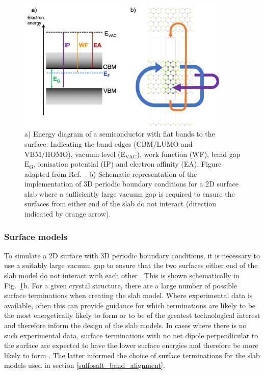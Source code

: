 \documentclass[11pt, twoside]{report}
\begin{document}
\begin{figure}[h!]
  \centering
    \includegraphics[width=0.9\textwidth]{figures/new_slab_figs.png}
    \caption[a) Energy diagram of a semiconductor with flat bands to the surface. Indicating the band edges (CBM/LUMO and VBM/HOMO), vacuum level ($\mathrm{E_{VAC}}$), work function (WF), band gap $\mathrm{E_G}$, ionisation potential (IP) and electron affinity (EA). b) Schematic representation of the implementation of 3D periodic boundary conditions for a 2D surface slab where a sufficiently large vacuum gap is required to ensure the surfaces from either end of the slab do not interact (direction indicated by orange arrow).]{a) Energy diagram of a semiconductor with flat bands to the surface. Indicating the band edges (CBM/LUMO and VBM/HOMO), vacuum level ($\mathrm{E_{VAC}}$), work function (WF), band gap $\mathrm{E_G}$, ionisation potential (IP) and electron affinity (EA). Figure adapted from Ref.~. b) Schematic representation of the implementation of 3D periodic boundary conditions for a 2D surface slab where a sufficiently large vacuum gap is required to ensure the surfaces from either end of the slab do not interact (direction indicated by orange arrow).}
  \label{slabs}
\end{figure}

\subsubsection{Surface models}
To simulate a 2D surface with 3D periodic boundary conditions, it is necessary to use a suitably large vacuum gap to ensure that the two surfaces either end of the slab model do not interact with each other \cite{Prasad_ch6}. This is shown schematically in Fig.~\ref{slabs}b.
For a given crystal structure, there are a large number of possible surface terminations when creating the slab model. Where experimental data is available, often this can provide guidance for which terminations are likely to be the most energetically likely to form or to be of the greatest technological interest and therefore inform the design of the slab models. In cases where there is no such experimental data, surface terminations with no net dipole perpendicular to the surface are expected to have the lower surface energies and therefore be more likely to form \cite{Tasker}. The latter informed the choice of surface terminations for the slab models used in section \ref{sulfosalt_band_alignment}.
\end{document}

